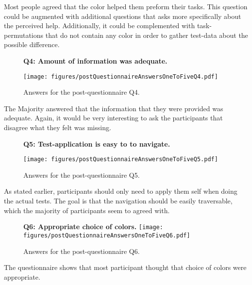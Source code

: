     Most people agreed that the color helped them preform their tasks.
    This question could be augmented with additional questions that asks
    more specifically about the perceived help. Additionally, it could be
    complemented with task-permutations that do not contain any color
    in order to gather test-data about the possible difference.

    \begin{figure}[h!]
      \textbf{Q4: Amount of information was adequate.}
      \begin{center}
        \texttt{[image: figures/postQuestionnaireAnswersOneToFiveQ4.pdf]}
        \caption{Answers for the post-questionnaire Q4.}
      \end{center}
    \end{figure}

    The Majority answered that the information that they were provided was
    adequate. Again, it would be very interesting to ask the participants
    that disagree what they felt was missing.

    \begin{figure}[h!]
      \textbf{Q5: Test-application is easy to to navigate.}
      \begin{center}
        \texttt{[image: figures/postQuestionnaireAnswersOneToFiveQ5.pdf]}
        \caption{Answers for the post-questionnaire Q5.}
      \end{center}
    \end{figure}

    As stated earlier, participants should only need to apply them self
    when doing the actual tests. The goal is that the navigation should be
    easily traversable, which the majority of participants seem to agreed with.

    \begin{figure}[h!]
      \begin{center}
        \textbf{Q6: Appropriate choice of colors.}
        \texttt{[image: figures/postQuestionnaireAnswersOneToFiveQ6.pdf]}
        \caption{Answers for the post-questionnaire Q6.}
      \end{center}
    \end{figure}

    The questionnaire shows that most participant thought that choice of
    colors were appropriate.

